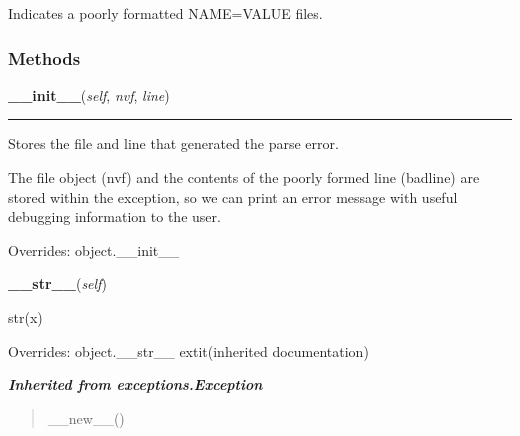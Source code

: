 Indicates a poorly formatted NAME=VALUE files.



  \subsubsection{Methods}

    \vspace{0.5ex}

\hspace{.8\funcindent}\begin{boxedminipage}{\funcwidth}

    \raggedright \textbf{\_\_init\_\_}(\textit{self}, \textit{nvf}, \textit{line})

    \vspace{-1.5ex}

    \rule{\textwidth}{0.5\fboxrule}
\setlength{\parskip}{2ex}
    Stores the file and line that generated the parse error.

    The file object (nvf) and the contents of the poorly formed line 
    (badline) are stored within the exception, so we can print an error 
    message with useful debugging information to the user.

\setlength{\parskip}{1ex}
      Overrides: object.\_\_init\_\_

    \end{boxedminipage}

    \vspace{0.5ex}

\hspace{.8\funcindent}\begin{boxedminipage}{\funcwidth}

    \raggedright \textbf{\_\_str\_\_}(\textit{self})

\setlength{\parskip}{2ex}
    str(x)

\setlength{\parskip}{1ex}
      Overrides: object.\_\_str\_\_ 	extit{(inherited documentation)}

    \end{boxedminipage}


\large{\textbf{\textit{Inherited from exceptions.Exception}}}

\begin{quote}
\_\_new\_\_()
\end{quote}


